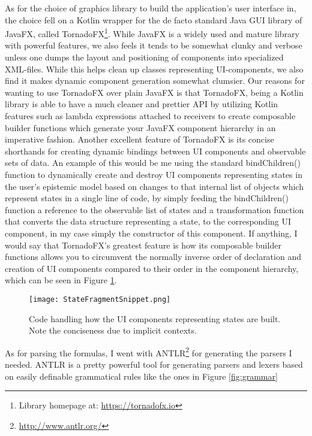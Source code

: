 As for the choice of graphics library to build the application's user interface in, the choice fell on a Kotlin wrapper for the de facto standard Java GUI library of JavaFX, called TornadoFX\footnote{Library homepage at: \url{https://tornadofx.io}}. While JavaFX is a widely used and mature library with powerful features, we also feels it tends to be somewhat clunky and verbose unless one dumps the layout and positioning of components into specialized XML-files. While this helps clean up classes representing UI-components, we also find it makes dynamic component generation somewhat clumsier. Our reasons for wanting to use TornadoFX over plain JavaFX is that TornadoFX, being a Kotlin library is able to have a much cleaner and prettier API by utilizing Kotlin features such as lambda expressions attached to receivers to create composable builder functions which generate your JavaFX component hierarchy in an imperative fashion. Another excellent feature of TornadoFX is its concise shorthands for creating dynamic bindings between UI components and observable sets of data. An example of this would be me using the standard bindChildren() function to dynamically create and destroy UI components representing states in the user's epistemic model based on changes to that internal list of objects which represent states in a single line of code, by simply feeding the bindChildren() function a reference to the observable list of states and a transformation function that converts the data structure representing a state, to the corresponding UI component, in my case simply the constructor of this component. If anything, I would say that TornadoFX's greatest feature is how its composable builder functions allows you to circumvent the normally inverse order of declaration and creation of UI components compared to their order in the component hierarchy, which can be seen in Figure \ref{fig:StatFragSnip}. 

\begin{figure}[h]
	\label{fig:StatFragSnip}
	\caption{Code handling how the UI components representing states are built. Note the conciseness due to 		implicit contexts.}
	\texttt{[image: StateFragmentSnippet.png]}
\end{figure}

As for parsing the formulas, I went with ANTLR\footnote{\url{http://www.antlr.org/}} for generating the parsers I needed. ANTLR is a pretty powerful tool for generating parsers and lexers based on easily definable grammatical rules like the ones in Figure \ref{fig:grammar}

